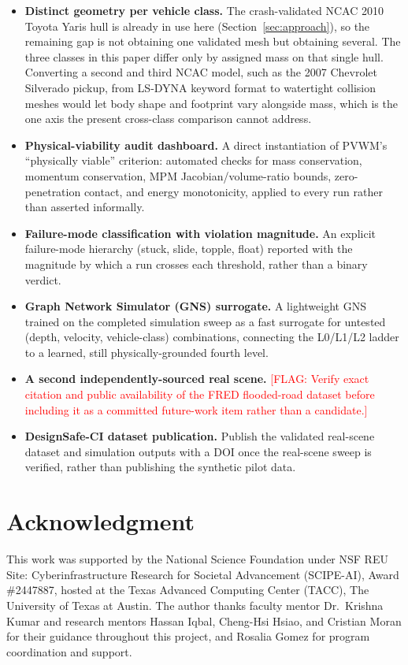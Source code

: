 \documentclass[conference]{IEEEtran}
\newcommand{\FLAG}[1]{\textcolor{red}{[FLAG: #1]}}
\begin{document}
\begin{itemize}
\item \textbf{Distinct geometry per vehicle class.} The crash-validated NCAC 2010 Toyota Yaris hull is already in use here (Section~\ref{sec:approach}), so the remaining gap is not obtaining one validated mesh but obtaining several. The three classes in this paper differ only by assigned mass on that single hull. Converting a second and third NCAC model, such as the 2007 Chevrolet Silverado pickup, from LS-DYNA keyword format to watertight collision meshes would let body shape and footprint vary alongside mass, which is the one axis the present cross-class comparison cannot address.
\item \textbf{Physical-viability audit dashboard.} A direct instantiation of PVWM's ``physically viable'' criterion: automated checks for mass conservation, momentum conservation, MPM Jacobian/volume-ratio bounds, zero-penetration contact, and energy monotonicity, applied to every run rather than asserted informally.
\item \textbf{Failure-mode classification with violation magnitude.} An explicit failure-mode hierarchy (stuck, slide, topple, float) reported with the magnitude by which a run crosses each threshold, rather than a binary verdict.
\item \textbf{Graph Network Simulator (GNS) surrogate.} A lightweight GNS trained on the completed simulation sweep as a fast surrogate for untested (depth, velocity, vehicle-class) combinations, connecting the L0/L1/L2 ladder to a learned, still physically-grounded fourth level.
\item \textbf{A second independently-sourced real scene.} \FLAG{Verify exact citation and public availability of the FRED flooded-road dataset before including it as a committed future-work item rather than a candidate.}
\item \textbf{DesignSafe-CI dataset publication.} Publish the validated real-scene dataset and simulation outputs with a DOI once the real-scene sweep is verified, rather than publishing the synthetic pilot data.
\end{itemize}

\section*{Acknowledgment}
This work was supported by the National Science Foundation under NSF REU Site: Cyberinfrastructure Research for Societal Advancement (SCIPE-AI), Award \#2447887, hosted at the Texas Advanced Computing Center (TACC), The University of Texas at Austin. The author thanks faculty mentor Dr.\ Krishna Kumar and research mentors Hassan Iqbal, Cheng-Hsi Hsiao, and Cristian Moran for their guidance throughout this project, and Rosalia Gomez for program coordination and support.
\end{document}
